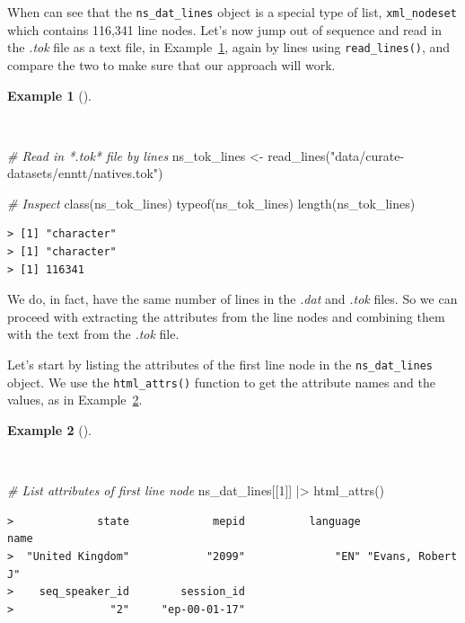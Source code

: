 \documentclass[
  letterpaper,
  DIV=11,
  numbers=noendperiod]{scrreport}
\newenvironment{Shaded}{\begin{snugshade}}{\end{snugshade}}
\newcommand{\CommentTok}[1]{\textcolor[rgb]{0.00,0.00,0.00}{\textit{#1}}}
\newcommand{\DecValTok}[1]{\textcolor[rgb]{0.00,0.00,0.00}{#1}}
\newcommand{\FunctionTok}[1]{\textcolor[rgb]{0.00,0.00,0.00}{#1}}
\newcommand{\NormalTok}[1]{\textcolor[rgb]{0.00,0.00,0.00}{#1}}
\newcommand{\OtherTok}[1]{\textcolor[rgb]{0.00,0.00,0.00}{#1}}
\newcommand{\SpecialCharTok}[1]{\textcolor[rgb]{0.00,0.00,0.00}{#1}}
\newcommand{\StringTok}[1]{\textcolor[rgb]{0.00,0.00,0.00}{#1}}
\theoremstyle{definition}
\newtheorem{example}{Example}[chapter]
\theoremstyle{remark}
\begin{document}
When can see that the \texttt{ns\_dat\_lines} object is a special type
of list, \texttt{xml\_nodeset} which contains 116,341 line nodes. Let's
now jump out of sequence and read in the \emph{.tok} file as a text
file, in Example~\ref{exm-cd-enntt-read-lines}, again by lines using
\texttt{read\_lines()}, and compare the two to make sure that our
approach will work.

\begin{example}[]\protect\hypertarget{exm-cd-enntt-read-lines}{}\label{exm-cd-enntt-read-lines}

~

\begin{Shaded}
\begin{Highlighting}[]
\CommentTok{\# Read in *.tok* file by lines}
\NormalTok{ns\_tok\_lines }\OtherTok{\textless{}{-}} 
  \FunctionTok{read\_lines}\NormalTok{(}\StringTok{"data/curate{-}datasets/enntt/natives.tok"}\NormalTok{)}

\CommentTok{\# Inspect}
\FunctionTok{class}\NormalTok{(ns\_tok\_lines)}
\FunctionTok{typeof}\NormalTok{(ns\_tok\_lines)}
\FunctionTok{length}\NormalTok{(ns\_tok\_lines)}
\end{Highlighting}
\end{Shaded}

\begin{verbatim}
> [1] "character"
> [1] "character"
> [1] 116341
\end{verbatim}

\end{example}

We do, in fact, have the same number of lines in the \emph{.dat} and
\emph{.tok} files. So we can proceed with extracting the attributes from
the line nodes and combining them with the text from the \emph{.tok}
file.

Let's start by listing the attributes of the first line node in the
\texttt{ns\_dat\_lines} object. We use the \texttt{html\_attrs()}
function to get the attribute names and the values, as in
Example~\ref{exm-cd-enntt-list-attributes}.

\begin{example}[]\protect\hypertarget{exm-cd-enntt-list-attributes}{}\label{exm-cd-enntt-list-attributes}

~

\begin{Shaded}
\begin{Highlighting}[]
\CommentTok{\# List attributes of first line node}
\NormalTok{ns\_dat\_lines[[}\DecValTok{1}\NormalTok{]] }\SpecialCharTok{|\textgreater{}} 
  \FunctionTok{html\_attrs}\NormalTok{()}
\end{Highlighting}
\end{Shaded}

\begin{verbatim}
>             state             mepid          language              name 
>  "United Kingdom"            "2099"              "EN" "Evans, Robert J" 
>    seq_speaker_id        session_id 
>               "2"     "ep-00-01-17"
\end{verbatim}

\end{example}
\end{document}
